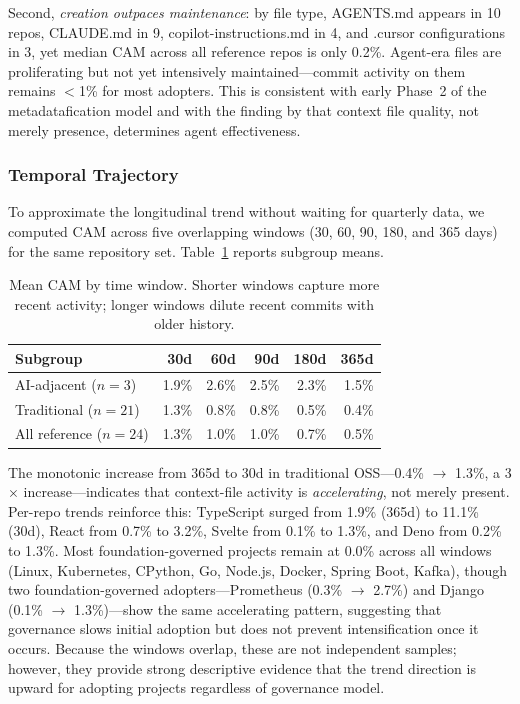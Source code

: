\documentclass[sigconf, nonacm, anonymous=false]{acmart}
\begin{document}
Second, \textit{creation outpaces maintenance}: by file type, AGENTS.md appears in 10 repos, CLAUDE.md in 9, copilot-instructions.md in 4, and .cursor configurations in 3, yet median CAM across all reference repos is only 0.2\%. Agent-era files are proliferating but not yet intensively maintained---commit activity on them remains $<$1\% for most adopters. This is consistent with early Phase~2 of the metadatafication model and with the finding by \citet{gloaguen2026evaluatingagentsmd} that context file quality, not merely presence, determines agent effectiveness.

\subsubsection{Temporal Trajectory}

To approximate the longitudinal trend without waiting for quarterly data, we computed CAM across five overlapping windows (30, 60, 90, 180, and 365 days) for the same repository set. Table~\ref{tab:cam-temporal} reports subgroup means.

\begin{table}[ht]
\centering
\small
\begin{tabularx}{\textwidth}{lrrrrr}
\toprule
\textbf{Subgroup} & \textbf{30d} & \textbf{60d} & \textbf{90d} & \textbf{180d} & \textbf{365d} \\
\midrule
AI-adjacent ($n=3$) & 1.9\% & 2.6\% & 2.5\% & 2.3\% & 1.5\% \\
Traditional ($n=21$) & 1.3\% & 0.8\% & 0.8\% & 0.5\% & 0.4\% \\
All reference ($n=24$) & 1.3\% & 1.0\% & 1.0\% & 0.7\% & 0.5\% \\
\bottomrule
\end{tabularx}
\caption{Mean CAM by time window. Shorter windows capture more recent activity; longer windows dilute recent commits with older history.}
\label{tab:cam-temporal}
\end{table}

The monotonic increase from 365d to 30d in traditional OSS---0.4\% $\to$ 1.3\%, a 3$\times$ increase---indicates that context-file activity is \textit{accelerating}, not merely present. Per-repo trends reinforce this: TypeScript surged from 1.9\% (365d) to 11.1\% (30d), React from 0.7\% to 3.2\%, Svelte from 0.1\% to 1.3\%, and Deno from 0.2\% to 1.3\%. Most foundation-governed projects remain at 0.0\% across all windows (Linux, Kubernetes, CPython, Go, Node.js, Docker, Spring Boot, Kafka), though two foundation-governed adopters---Prometheus (0.3\% $\to$ 2.7\%) and Django (0.1\% $\to$ 1.3\%)---show the same accelerating pattern, suggesting that governance slows initial adoption but does not prevent intensification once it occurs. Because the windows overlap, these are not independent samples; however, they provide strong descriptive evidence that the trend direction is upward for adopting projects regardless of governance model.
\end{document}
